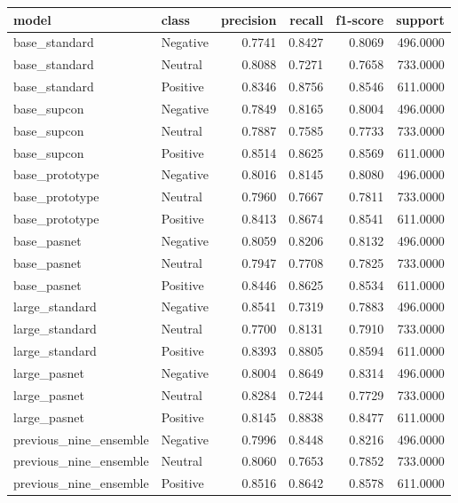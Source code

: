 \begin{tabular}{llrrrr}
\toprule
model & class & precision & recall & f1-score & support \\
\midrule
base\_standard & Negative & 0.7741 & 0.8427 & 0.8069 & 496.0000 \\
base\_standard & Neutral & 0.8088 & 0.7271 & 0.7658 & 733.0000 \\
base\_standard & Positive & 0.8346 & 0.8756 & 0.8546 & 611.0000 \\
base\_supcon & Negative & 0.7849 & 0.8165 & 0.8004 & 496.0000 \\
base\_supcon & Neutral & 0.7887 & 0.7585 & 0.7733 & 733.0000 \\
base\_supcon & Positive & 0.8514 & 0.8625 & 0.8569 & 611.0000 \\
base\_prototype & Negative & 0.8016 & 0.8145 & 0.8080 & 496.0000 \\
base\_prototype & Neutral & 0.7960 & 0.7667 & 0.7811 & 733.0000 \\
base\_prototype & Positive & 0.8413 & 0.8674 & 0.8541 & 611.0000 \\
base\_pasnet & Negative & 0.8059 & 0.8206 & 0.8132 & 496.0000 \\
base\_pasnet & Neutral & 0.7947 & 0.7708 & 0.7825 & 733.0000 \\
base\_pasnet & Positive & 0.8446 & 0.8625 & 0.8534 & 611.0000 \\
large\_standard & Negative & 0.8541 & 0.7319 & 0.7883 & 496.0000 \\
large\_standard & Neutral & 0.7700 & 0.8131 & 0.7910 & 733.0000 \\
large\_standard & Positive & 0.8393 & 0.8805 & 0.8594 & 611.0000 \\
large\_pasnet & Negative & 0.8004 & 0.8649 & 0.8314 & 496.0000 \\
large\_pasnet & Neutral & 0.8284 & 0.7244 & 0.7729 & 733.0000 \\
large\_pasnet & Positive & 0.8145 & 0.8838 & 0.8477 & 611.0000 \\
previous\_nine\_ensemble & Negative & 0.7996 & 0.8448 & 0.8216 & 496.0000 \\
previous\_nine\_ensemble & Neutral & 0.8060 & 0.7653 & 0.7852 & 733.0000 \\
previous\_nine\_ensemble & Positive & 0.8516 & 0.8642 & 0.8578 & 611.0000 \\
\bottomrule
\end{tabular}
